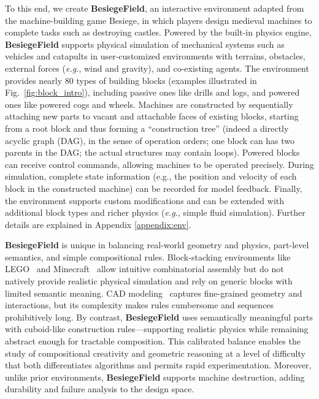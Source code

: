 \documentclass{article} %
\makeatletter
\newcommand*{\eg}{{\it e.g.}\@\xspace}
\newcommand{\envname}{\textbf{BesiegeField}\xspace}
\theoremstyle{plain}
\theoremstyle{definition}
\makeatother
\begin{document}
To this end, we create \envname, an interactive environment adapted from the machine-building game Besiege, in which players design medieval machines to complete tasks such as destroying castles. 
Powered by the built-in physics engine, \envname supports physical simulation of mechanical systems such as vehicles and catapults in user-customized environments with terrains, obstacles, external forces (\eg, wind and gravity), and co-existing agents. The environment provides nearly 80 types of building blocks (examples illustrated in Fig.~\ref{fig:block_intro}), including passive ones like drills and logs, and powered ones like powered cogs and wheels.
Machines are constructed by sequentially attaching new parts to vacant and attachable faces of existing blocks, starting from a root block and thus forming a ``construction tree'' (indeed a directly acyclic graph (DAG), in the sense of operation orders; one block can has two parents in the DAG; the actual structures may contain loops).
Powered blocks can receive control commands, allowing machines to be operated precisely. During simulation, complete state information (e.g., the position and velocity of each block in the constructed machine) can be recorded for model feedback. Finally, the environment supports custom modifications and can be extended with additional block types and richer physics (\eg, simple fluid simulation). Further details are explained in Appendix \ref{appendix:env}.




\envname is unique in balancing real-world geometry and physics, part-level semantics, and simple compositional rules. Block-stacking environments like LEGO~\citep{fan2022minedojo} and Minecraft~\citep{fan2022minedojo,pun2025generating} allow intuitive combinatorial assembly but do not natively provide realistic physical simulation and rely on generic blocks with limited semantic meaning. CAD modeling~\citep{li2025cad} captures fine-grained geometry and interactions, but its complexity makes rules cumbersome and sequences prohibitively long. By contrast, \envname uses semantically meaningful parts with cuboid-like construction rules—supporting realistic physics while remaining abstract enough for tractable composition. This calibrated balance enables the study of compositional creativity and geometric reasoning at a level of difficulty that both differentiates algorithms and permits rapid experimentation. Moreover, unlike prior environments, \envname supports machine destruction, adding durability and failure analysis to the design space.
\end{document}
